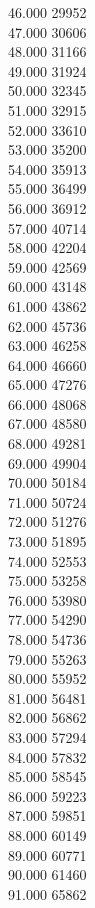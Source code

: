 { 46.000	29952 \\
 47.000	30606 \\
 48.000	31166 \\
 49.000	31924 \\
 50.000	32345 \\
 51.000	32915 \\
 52.000	33610 \\
 53.000	35200 \\
 54.000	35913 \\
 55.000	36499 \\
 56.000	36912 \\
 57.000	40714 \\
 58.000	42204 \\
 59.000	42569 \\
 60.000	43148 \\
 61.000	43862 \\
 62.000	45736 \\
 63.000	46258 \\
 64.000	46660 \\
 65.000	47276 \\
 66.000	48068 \\
 67.000	48580 \\
 68.000	49281 \\
 69.000	49904 \\
 70.000	50184 \\
 71.000	50724 \\
 72.000	51276 \\
 73.000	51895 \\
 74.000	52553 \\
 75.000	53258 \\
 76.000	53980 \\
 77.000	54290 \\
 78.000	54736 \\
 79.000	55263 \\
 80.000	55952 \\
 81.000	56481 \\
 82.000	56862 \\
 83.000	57294 \\
 84.000	57832 \\
 85.000	58545 \\
 86.000	59223 \\
 87.000	59851 \\
 88.000	60149 \\
 89.000	60771 \\
 90.000	61460 \\
 91.000	65862 \\
}
